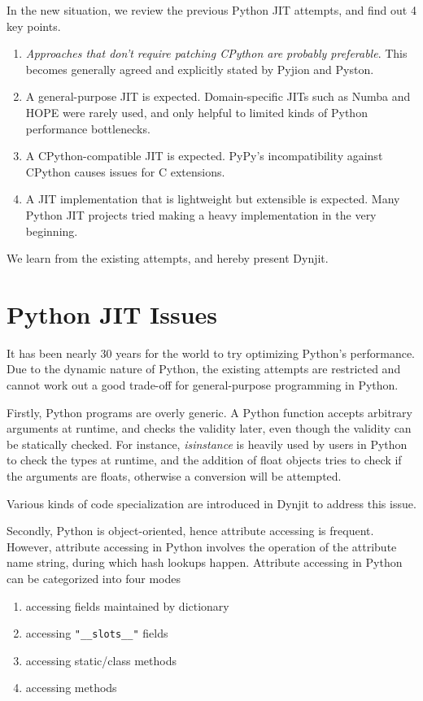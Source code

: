 \documentclass[conference]{IEEEtran}
\begin{document}
In the new situation, we review the previous Python JIT attempts, and find out 4 key points.
\begin{enumerate}
    \item \textit{Approaches that don't require patching CPython are probably preferable}. This becomes generally agreed and explicitly stated by Pyjion and Pyston.
    \item A general-purpose JIT is expected. Domain-specific JITs such as Numba and HOPE were rarely used,  and only helpful to limited kinds of Python performance bottlenecks.
    \item A CPython-compatible JIT is expected. PyPy's incompatibility against CPython causes issues for C extensions.
    \item A JIT implementation that is lightweight but extensible is expected. Many Python JIT projects tried making a heavy implementation in the very beginning.
\end{enumerate}

We learn from the existing attempts, and hereby present Dynjit.

\section{Python JIT Issues}

It has been nearly 30 years for the world to try optimizing Python's performance.
Due to the dynamic nature of Python, the existing attempts are restricted and
cannot work out a good trade-off for general-purpose programming in Python.

Firstly, Python programs are overly generic. A Python function accepts arbitrary arguments at runtime,
and checks the validity later, even though the validity can be statically checked. For instance, \textit{isinstance}
is heavily used by users in Python to check the types at runtime, and the addition of float objects tries to check
if the arguments are floats, otherwise a conversion will be attempted.

Various kinds of code specialization are introduced in Dynjit to address this issue.

Secondly, Python is object-oriented, hence attribute accessing is frequent. However, attribute accessing in Python
involves the operation of the attribute name string, during which hash lookups happen.
Attribute accessing in Python can be categorized into four modes

\begin{enumerate}
    \item accessing fields maintained by dictionary
    \item accessing \lstinline!"__slots__"! fields
    \item accessing static/class methods
    \item accessing methods
\end{enumerate}
\end{document}
